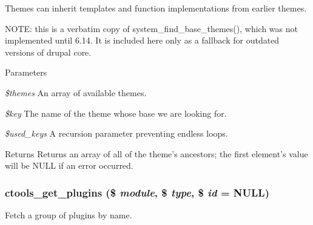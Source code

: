 Themes can inherit templates and function implementations from earlier themes.

NOTE: this is a verbatim copy of system\_\-find\_\-base\_\-themes(), which was not implemented until 6.14. It is included here only as a fallback for outdated versions of drupal core.


\begin{DoxyParams}{Parameters}
\item[{\em \$themes}]An array of available themes. \item[{\em \$key}]The name of the theme whose base we are looking for. \item[{\em \$used\_\-keys}]A recursion parameter preventing endless loops. \end{DoxyParams}
\begin{DoxyReturn}{Returns}
Returns an array of all of the theme's ancestors; the first element's value will be NULL if an error occurred. 
\end{DoxyReturn}
\hypertarget{ctools_2includes_2plugins_8inc_aad93a9aa7b585e33d6696ac0b9ec42fc}{
\subsubsection[{ctools\_\-get\_\-plugins}]{\setlength{\rightskip}{0pt plus 5cm}ctools\_\-get\_\-plugins (\$ {\em module}, \/  \$ {\em type}, \/  \$ {\em id} = {\ttfamily NULL})}}
\label{ctools_2includes_2plugins_8inc_aad93a9aa7b585e33d6696ac0b9ec42fc}
Fetch a group of plugins by name.


